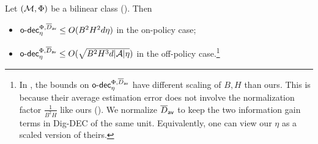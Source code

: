\begin{lemma} \label{lem: bilinear complexity sto}
Let $(\mathcal{M}, \Phi)$ be a bilinear class (). Then 
\begin{itemize}[leftmargin=1em, nosep]
 \setlength{\itemsep}{0pt} %
    \setlength{\parskip}{0pt} 
    \setlength{\topsep}{0pt}
    \item $\mathsf{o}\text{-}\mathsf{dec}_\eta^{\Phi,\overline{D}_{\mathsf{av}}}  \le O(B^2H^2 d\eta)$ in the on-policy case; 
    \item $\mathsf{o}\text{-}\mathsf{dec}_\eta^{\Phi,\overline{D}_{\mathsf{av}}}  \le O(\sqrt{B^2 H^3 d|\mathcal{A}|\eta})$ in the off-policy case.\footnote{\label{foot: foot}In \cite{foster2024model}, the bounds on $\mathsf{o}\text{-}\mathsf{dec}_\eta^{\Phi, \overline{D}_{\mathsf{av}}}$ have different scaling of $B,H$ than ours. This is because their average estimation error does not involve the normalization factor $\frac{1}{B^2H}$ like ours (). We normalize $\overline{D}_{\mathsf{av}}$ to keep the two information gain terms in Dig-DEC of the same unit. Equivalently, one can view our $\eta$ as a scaled version of theirs.    %
    }
\end{itemize}
\end{lemma}





